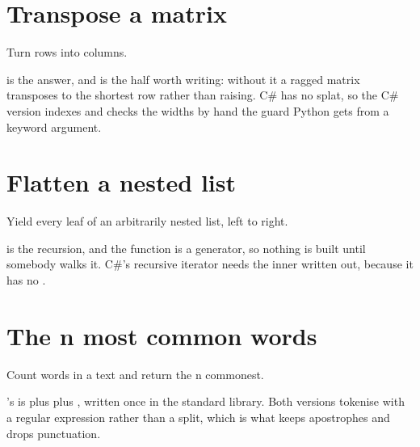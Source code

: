 \section{Transpose a matrix}
\label{sec:appD-transpose}

\noindent
Turn rows into columns.



\noindent
{} is the answer, and  is the half worth writing: without it a ragged matrix transposes to the shortest row rather than raising. C\# has no splat, so the C\# version indexes and checks the widths by hand \dash{} the guard Python gets from a keyword argument.

\section{Flatten a nested list}
\label{sec:appD-flatten}

\noindent
Yield every leaf of an arbitrarily nested list, left to right.



\noindent
{} is the recursion, and the function is a generator, so nothing is built until somebody walks it. C\#'s recursive iterator needs the inner  written out, because it has no .

\section{The n most common words}
\label{sec:appD-top-words}

\noindent
Count words in a text and return the n commonest.



\noindent
{}'s  is  plus  plus , written once in the standard library. Both versions tokenise with a regular expression rather than a split, which is what keeps apostrophes and drops punctuation.

